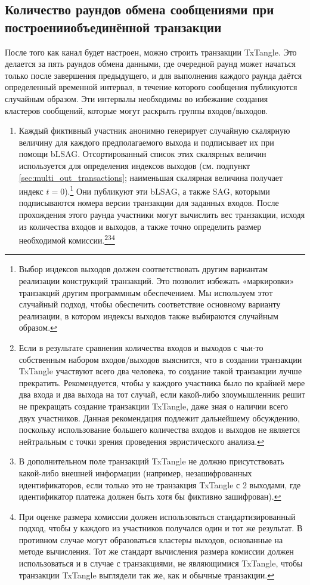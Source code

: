 \subsection{Количество раундов обмена сообщениями при построении\linebreak объединённой транзакции}
\label{subsec:message-rounds-txtangle}

После того как канал будет настроен, можно строить транзакции TxTangle. Это делается за пять раундов обмена данными, где очередной раунд может начаться только после завершения предыдущего, и для выполнения каждого раунда даётся определенный временной интервал, в течение которого сообщения публикуются случайным образом. Эти интервалы необходимы во избежание создания кластеров сообщений, которые могут раскрыть группы входов/выходов.
\begin{enumerate}
    \item Каждый фиктивный участник анонимно генерирует случайную скалярную величину для каждого предполагаемого выхода и подписывает их при помощи bLSAG. Отсортиро\-ванный список этих скалярных величин используется для определения индексов выходов (см. подпункт \ref{sec:multi_out_transactions}; наименьшая скалярная величина получает индекс $t = 0$).\footnote{Выбор индексов выходов должен соответствовать другим вариантам реализации конструкций транзакций. Это позволит избежать «маркировки» транзакций другим программным обеспечением. Мы используем этот случайный подход, чтобы обеспечить соответствие основному варианту реализации, в котором индексы выходов также выбираются случайным образом.} Они публикуют эти bLSAG, а также SAG, которыми подписываются номера версии транзак\-ции для заданных входов. После прохождения этого раунда участники могут вычислить вес транзакции, исходя из количества входов и выходов, а также точно определить размер необходимой комиссии.\footnote{Если в результате сравнения количества входов и выходов с чьи-то собственным набором входов/выходов выяснится, что в создании транзакции TxTangle участвуют всего два человека, то создание такой транзакции лучше прекратить. Рекомендуется, чтобы у каждого участника было по крайней мере два входа и два выхода на тот случай, если какой-либо злоумышленник решит не прекращать создание транзакции TxTangle, даже зная о наличии всего двух участников. Данная рекомендация подлежит дальнейшему обсуждению, поскольку использование большего количества входов и выходов не является нейтральным с точки зрения проведения эвристического анализа.}\footnote{В дополнительном поле транзакций TxTangle не должно присутствовать какой-либо внешней информации (например, незашифрованных идентификаторов, если только это не транзакция TxTangle с 2 выходами, где идентификатор платежа должен быть хотя бы фиктивно зашифрован).}\footnote{При оценке размера комиссии должен использоваться стандартизированный подход, чтобы у каждого из участников получался один и тот же результат. В противном случае могут образоваться кластеры выходов, основанные на методе вычисления. Тот же стандарт вычисления размера комиссии должен использоваться и в случае с транзакциями, не являющимися TxTangle, чтобы транзакции TxTangle выглядели так же, как и обычные транзакции.}

\end{enumerate}

